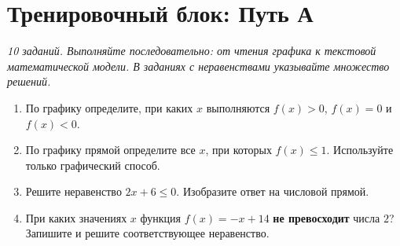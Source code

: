 \documentclass[a4paper,12pt]{article}
\newcommand{\lessonsection}[1]{\section*{#1}}
\begin{document}
\clearpage
\lessonsection{Тренировочный блок: Путь А}
\emph{10 заданий. Выполняйте последовательно: от чтения графика к текстовой математической модели. В заданиях с неравенствами указывайте множество решений.}
\begin{enumerate}[label=\textbf{\arabic*.}]
\item По графику определите, при каких $x$ выполняются $f(x)>0$, $f(x)=0$ и $f(x)<0$.
\begin{center}
\end{center}
\item По графику прямой определите все $x$, при которых $f(x)\le1$. Используйте только графический способ.
\begin{center}
\end{center}
\item Решите неравенство $2x+6\le0$. Изобразите ответ на числовой прямой.
\item При каких значениях $x$ функция $f(x)=-x+14$ \textbf{не превосходит} числа $2$? Запишите и решите соответствующее неравенство.
\end{enumerate}
\end{document}
